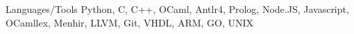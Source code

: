 


\begin{cvskills}


\cvskill
{Languages/Tools} %
{Python, C, C++, OCaml, Antlr4, Prolog, Node.JS, Javascript, OCamllex, Menhir, LLVM, Git, VHDL, ARM, GO, UNIX}



\end{cvskills}